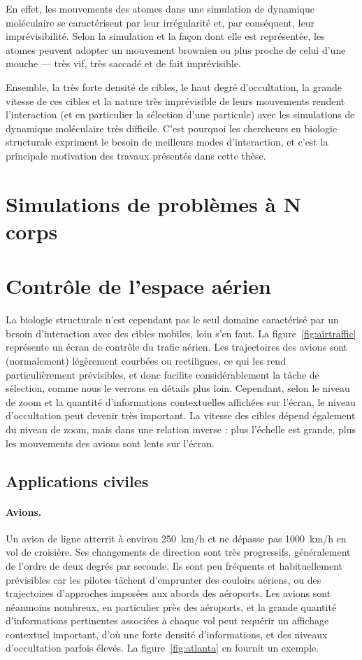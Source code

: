 	En effet, les mouvements des atomes dans une simulation de dynamique moléculaire se caractérisent par leur irrégularité et, par conséquent, leur imprévisibilité. Selon la simulation et la façon dont elle est représentée, les atomes peuvent adopter un mouvement brownien ou plus proche de celui d'une mouche --- très vif, très saccadé et de fait imprévisible.
	
	Ensemble, la très forte densité de cibles, le haut degré d'occultation, la grande vitesse de ces cibles et la nature très imprévisible de leurs mouvements rendent l'interaction (et en particulier la sélection d'une particule) avec les simulations de dynamique moléculaire très difficile. C'est pourquoi les chercheurs en biologie structurale expriment le besoin de meilleurs modes d'interaction, et c'est la principale motivation des travaux présentés dans cette thèse.
	
	\section{Simulations de problèmes à N corps}
	
	\section{Contrôle de l'espace aérien}
	La biologie structurale n'est cependant pas le seul domaine caractérisé par un besoin d'interaction avec des cibles mobiles, loin s'en faut. La figure~\ref{fig:airtraffic} représente un écran de contrôle du trafic aérien. Les trajectoires des avions sont (normalement) légèrement courbées ou rectilignes, ce qui les rend particulièrement prévisibles, et donc facilite considérablement la tâche de sélection, comme nous le verrons en détails plus loin. Cependant, selon le niveau de zoom et la quantité d'informations contextuelles affichées sur l'écran, le niveau d'occultation peut devenir très important. La vitesse des cibles dépend également du niveau de zoom, mais dans une relation inverse : plus l'échelle est grande, plus les mouvements des avions sont lents sur l'écran.
	
	\subsection{Applications civiles}
	\paragraph{Avions.}
	Un avion de ligne atterrit à environ 250~km/h et ne dépasse pas 1000~km/h en vol de croisière. Ses changements de direction sont très progressifs, généralement de l'ordre de deux degrés par seconde. Ils sont peu fréquents et habituellement prévisibles car les pilotes tâchent d'emprunter des couloirs aériens, ou des trajectoires d'approches imposées aux abords des aéroports. Les avions sont néanmoins nombreux, en particulier près des aéroports, et la grande quantité d'informations pertinentes associées à chaque vol peut requérir un affichage contextuel important, d'où une forte densité d'informations, et des niveaux d'occultation parfois élevés. La figure~\ref{fig:atlanta} en fournit un exemple.
	
